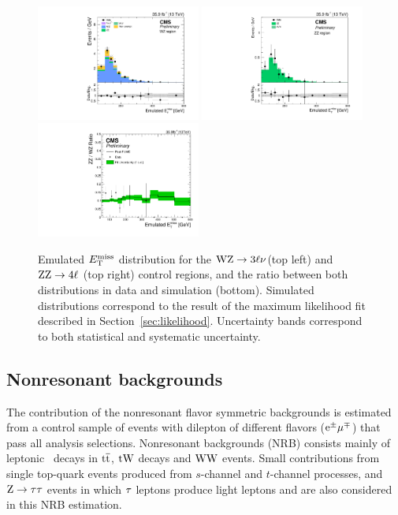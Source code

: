 \begin{figure}[htbp]
\centering
\includegraphics[width=0.48\textwidth]{figures/wz_fakemet_allcuts_postfit.pdf}
\includegraphics[width=0.48\textwidth]{figures/zz_fakemet_allcuts_postfit.pdf}
\includegraphics[width=0.48\textwidth]{figures/ratio_zzvswz.pdf}
\caption{Emulated $E_\mathrm{T}^{\mathrm{miss}}$
distribution for  the $\mathrm{W}\mathrm{Z} \to 3\ell\nu$(top left) and $\mathrm{Z}\mathrm{Z} \to 4\ell$ (top right)
control regions, and the ratio between both distributions in data and simulation (bottom).
Simulated distributions correspond to the result of the maximum likelihood fit described in Section~\ref{sec:likelihood}.
 Uncertainty bands correspond to both statistical and systematic uncertainty.}
\label{fig:histo_fakemet}
\end{figure}

\subsection{Nonresonant backgrounds}
\label{ss:dm_nrb}
The contribution of the nonresonant flavor symmetric backgrounds is estimated from a control
sample of events with dilepton of different flavors
($\mathrm{e}^{\pm}\mathrm{\mu}^{\mp}$) that pass all analysis selections.
Nonresonant backgrounds (NRB) consists mainly of leptonic \PW\ decays in
${\mathrm{t}\overline{\mathrm{t}}}$, $\mathrm{t}\mathrm{W}$ decays and 
$\mathrm{W}\mathrm{W}$ events. Small contributions from single top-quark events produced from
$s$-channel and $t$-channel processes, and $\mathrm{Z}\rightarrow \mathrm{\tau}\mathrm{\tau}$
events in which $\mathrm{\tau}$ leptons produce light leptons and \ETm are also
considered in this NRB estimation. 

